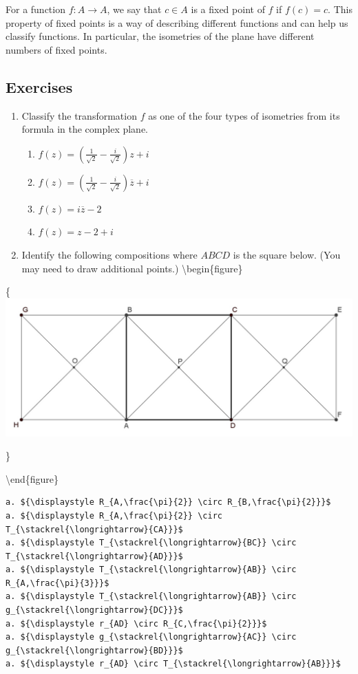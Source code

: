 \documentclass[
]{book}
\providecommand{\tightlist}{%
  \setlength{\itemsep}{0pt}\setlength{\parskip}{0pt}}
\theoremstyle{definition}
\theoremstyle{definition}
\theoremstyle{definition}
\theoremstyle{definition}
\theoremstyle{remark}
\begin{document}
For a function \(f:A\rightarrow A\), we say that \(c\in A\) is a fixed point of \(f\) if \(f(c)=c\). This property of fixed points is a way of describing different functions and can help us classify functions. In particular, the isometries of the plane have different numbers of fixed points.

\hypertarget{exercises-56}{%
\subsection{Exercises}\label{exercises-56}}

\begin{enumerate}
\def\labelenumi{\arabic{enumi}.}
\item
  Classify the transformation \(f\) as one of the four types of isometries from its formula in the complex plane.

  \begin{enumerate}
  \def\labelenumii{\alph{enumii}.}
  \tightlist
  \item
    \(\displaystyle{f(z)=\left( \frac{1}{\sqrt{2}} - \frac{i}{\sqrt{2}} \right) z +i}\)
  \item
    \(\displaystyle{f(z)=\left( \frac{1}{\sqrt{2}} - \frac{i}{\sqrt{2}} \right) \overline{z} +i}\)
  \item
    \(\displaystyle{f(z)=i\overline{z}-2}\)
  \item
    \(\displaystyle{f(z)=z-2+i}\)
  \end{enumerate}
\item
  Identify the following compositions where \(ABCD\) is the square below. (You may need to draw additional points.)
  \textbackslash begin\{figure\}
\end{enumerate}

\{\centering \includegraphics[width=0.5\linewidth]{images/transformationgraph}

\}

\textbackslash end\{figure\}

\begin{verbatim}
a. ${\displaystyle R_{A,\frac{\pi}{2}} \circ R_{B,\frac{\pi}{2}}}$
a. ${\displaystyle R_{A,\frac{\pi}{2}} \circ T_{\stackrel{\longrightarrow}{CA}}}$
a. ${\displaystyle T_{\stackrel{\longrightarrow}{BC}} \circ T_{\stackrel{\longrightarrow}{AD}}}$
a. ${\displaystyle T_{\stackrel{\longrightarrow}{AB}} \circ R_{A,\frac{\pi}{3}}}$
a. ${\displaystyle T_{\stackrel{\longrightarrow}{AB}} \circ g_{\stackrel{\longrightarrow}{DC}}}$
a. ${\displaystyle r_{AD} \circ R_{C,\frac{\pi}{2}}}$
a. ${\displaystyle g_{\stackrel{\longrightarrow}{AC}} \circ g_{\stackrel{\longrightarrow}{BD}}}$
a. ${\displaystyle r_{AD} \circ T_{\stackrel{\longrightarrow}{AB}}}$
\end{verbatim}
\end{document}
